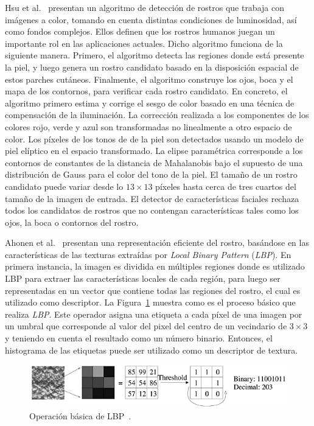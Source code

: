 Hsu et al.~\cite{Hsu2002} presentan un algoritmo de detección de rostros que trabaja con imágenes a color, tomando en cuenta distintas condiciones de luminosidad, así como fondos complejos. Ellos definen que los rostros humanos juegan un importante rol en las aplicaciones actuales. Dicho algoritmo funciona de la siguiente manera. Primero, el algoritmo detecta las regiones donde está presente la piel, y luego genera un rostro candidato basado en la disposición espacial de estos parches cutáneos. Finalmente, el algoritmo construye los ojos, boca y el mapa de los contornos, para verificar cada rostro candidato. En concreto, el algoritmo primero estima y corrige el sesgo de color basado en una técnica de compensación de la iluminación. La corrección realizada a los componentes de los colores rojo, verde y azul son transformadas no linealmente a otro espacio de color. Los píxeles de los tonos de de la piel son detectados usando un modelo de piel elíptico en el espacio transformado. La elipse paramétrica corresponde a los contornos de constantes de la distancia de Mahalanobis bajo el supuesto de una distribución de Gauss para el color del tono de la piel. El tamaño de un rostro candidato puede variar desde lo $13 \times 13$ píxeles hasta cerca de tres cuartos del tamaño de la imagen de entrada. El detector de características faciales rechaza todos los candidatos de rostros que no contengan características tales como los ojos, la boca o contornos del rostro.

Ahonen et al.~\cite{ahonen2006} presentan una representación eficiente del rostro, basándose en las características de las texturas extraídas por \textit{Local Binary Pattern} (\textit{LBP}). En primera instancia, la imagen es dividida en múltiples regiones donde es utilizado LBP para extraer las características locales de cada región, para luego ser representadas en un vector que contiene todas las regiones del rostro, el cual es utilizado como descriptor. La Figura~\ref{fig:lbp} muestra como es el proceso básico que realiza \textit{LBP}. Este operador asigna una etiqueta a cada píxel de una imagen por un umbral que corresponde al valor del pixel del centro de un vecindario de $3 \times 3$ y teniendo en cuenta el resultado como un número binario. Entonces, el histograma de las etiquetas puede ser utilizado como un descriptor de textura.

\begin{figure}[tb]
  \centering
   \includegraphics[width=1\textwidth]{Figuras/lbp.jpg}
   \caption{Operación básica de LBP~\cite{ahonen2006}.}
   \label{fig:lbp}
\end{figure}

